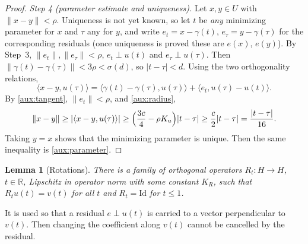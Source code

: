 \documentclass[11pt]{article}
\newcommand{\R}{\mathbb R}
\newcommand{\norm}[1]{\lVert #1\rVert}
\newcommand{\ip}[2]{\langle #1,#2\rangle}
\newtheorem{lemma}[theorem]{Lemma}
\theoremstyle{definition}
\numberwithin{equation}{section}
\begin{document}
\begin{proof}
\emph{Step 4 (parameter estimate and uniqueness).} Let \(x,y\in U\) with
\(\norm{x-y}<\rho\). Uniqueness is not yet known, so let \(t\) be \emph{any}
minimizing parameter for \(x\) and \(\tau\) any for \(y\), and write
\(e_t=x-\gamma(t)\), \(e_\tau=y-\gamma(\tau)\) for the corresponding
residuals (once uniqueness is proved these are \(e(x)\), \(e(y)\)). By
Step~3, \(\norm{e_t},\norm{e_\tau}<\rho\), \(e_t\perp u(t)\) and
\(e_\tau\perp u(\tau)\). Then
\(\norm{\gamma(t)-\gamma(\tau)}<3\rho<\sigma(d)\), so \(|t-\tau|<d\). Using
the two orthogonality relations,
\[
 \ip{x-y}{u(\tau)}
 =\ip{\gamma(t)-\gamma(\tau)}{u(\tau)}+\ip{e_t}{u(\tau)-u(t)} .
\]
By \eqref{aux:tangent}, \(\norm{e_t}<\rho\), and \eqref{aux:radius},
\[
 \norm{x-y}\ge|\ip{x-y}{u(\tau)}|
 \ge\Bigl(\frac{3c}4-\rho K_u\Bigr)|t-\tau|\ge\frac c2|t-\tau|
 =\frac{|t-\tau|}{16}.
\]
Taking \(y=x\) shows that the minimizing parameter is unique. Then the same
inequality is \eqref{aux:parameter}.
\end{proof}

\begin{lemma}[Rotations]\label{aux:rotation}
There is a family of orthogonal operators \(R_t:H\to H\), \(t\in\R\),
Lipschitz in operator norm with some constant \(K_R\), such that
\(R_tu(t)=v(t)\) for all \(t\) and \(R_t=\mathrm{Id}\) for \(t\le1\).
\end{lemma}
It is used so that a residual \(e\perp u(t)\) is carried to a vector
perpendicular to \(v(t)\). Then changing the coefficient along \(v(t)\)
cannot be cancelled by the residual.
\end{document}
